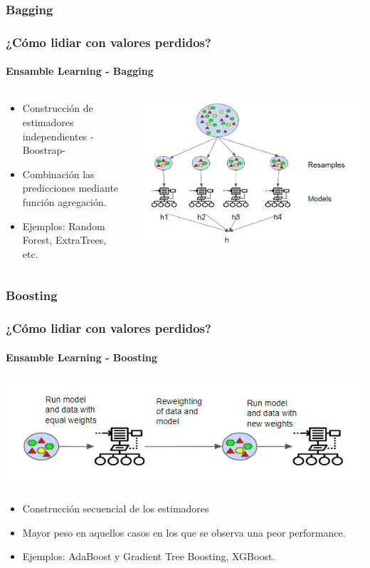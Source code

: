 \documentclass{beamer}
\begin{document}
\subsubsection{Bagging}
\begin{frame}
	\frametitle{¿Cómo lidiar con valores perdidos?}
	\framesubtitle{Ensamble Learning - Bagging}
	\begin{columns}
		\begin{column}{0.48\textwidth}
	\begin{itemize}		
		\item Construcción de estimadores independientes -Boostrap-
		\item  Combinación las predicciones mediante función agregación. 
		\item Ejemplos: Random Forest, ExtraTrees, etc.
	\end{itemize}
		\end{column}
		\begin{column}{0.85\textwidth}
			\includegraphics[width=0.7\linewidth, height=0.7\textheight]{../img/bagging}
		\end{column}
	\end{columns}
\end{frame}

\subsubsection{Boosting}
\begin{frame}
	\frametitle{¿Cómo lidiar con valores perdidos?}
	\framesubtitle{Ensamble Learning - Boosting}
	\includegraphics[width=1\linewidth, height=0.5\textheight]{../img/boosting}
	\begin{itemize}		
		\item Construcción secuencial de los estimadores 
		\item Mayor peso en aquellos casos en los que se observa una peor performance. 
		\item Ejemplos: AdaBoost y Gradient Tree Boosting, XGBoost.
	\end{itemize}
\end{frame}
\end{document}
